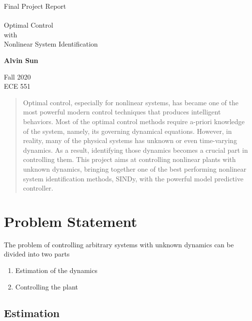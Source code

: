 \documentclass[10pt,twocolumn]{article}
\begin{document}
\begin{titlepage}
  \begin{center}
    \Huge
    Final Project Report \\
    \hfill \\
    Optimal Control \\ with \\ Nonlinear System Identification

    \vfill

    \Large
    \textbf{Alvin Sun} \\

    \vfill

    Fall 2020 \\
    ECE 551

  \end{center}
\end{titlepage}

\begin{abstract}
  Optimal control, especially for nonlinear systems, has became one of the most powerful
  modern control techniques that produces intelligent behaviors. Most of the optimal control
  methods require a-priori knowledge of the system, namely, its governing dynamical equations.
  However, in reality, many of the physical systems has unknown or even time-varying dynamics.
  As a result, identifying those dynamics becomes a crucial part in controlling them.
  This project aims at controlling nonlinear plants with unknown dynamics, bringing together
  one of the best performing nonlinear system identification methods, SINDy, with the
  powerful model predictive controller.
\end{abstract}

\section{Problem Statement}

The problem of controlling arbitrary systems with unknown dynamics can be divided into
two parts
\begin{enumerate}
  \item Estimation of the dynamics
  \item Controlling the plant
\end{enumerate}

\subsection{Estimation}
\end{document}
